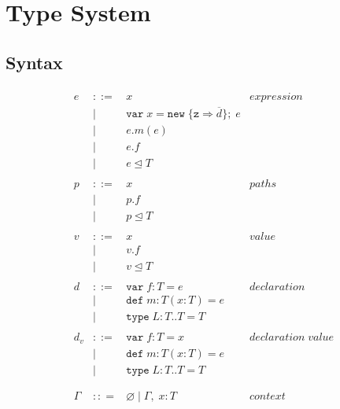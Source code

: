 \documentclass{llncs}
\begin{document}
\section{Type System}
	\label{s:type_sys}


\subsection{Syntax}


\begin{figure}[h]
\[
\begin{array}{lll}
\begin{array}{lllr}
e & ::= & x & expression \\
& | & \texttt{var} \; x = \texttt{new} \; \{\texttt{z} \Rightarrow \overline{d}\}; \; e&\\
& | & e.m(e) &\\
& | & e.f &\\
& | & e \unlhd T&\\
&&\\
p & ::= & x & paths \\
& | & p.f &\\
& | & p \unlhd T &\\
&&\\
v & ::= & x & value \\
& | & v.f &\\
& | & v \unlhd T &\\
&&\\
d & ::= & \texttt{var} \; f : T = e & declaration \\
  & |   & \texttt{def} \; m : T(x:T) = e &\\
  & |   & \texttt{type} \; L : T .. T = T &\\
&&\\
d_v & ::= & \texttt{var} \; f : T = x & declaration \; value \\
  & |   & \texttt{def} \; m : T(x:T) = e &\\
  & |   & \texttt{type} \; L : T .. T = T &\\
&&\\
&&\\
\Gamma & :: = & \varnothing \; | \; \Gamma, \; x : T & context \\

\end{array}
\end{array}\]
\end{figure}
\end{document}
